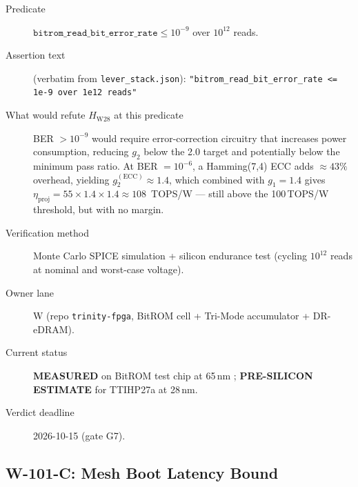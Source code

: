 \begin{description}
  \item[Predicate] \(\mathtt{bitrom\_read\_bit\_error\_rate}
    \leq 10^{-9}\) over \(10^{12}\) reads.
  \item[Assertion text] (verbatim from \texttt{lever\_stack.json}):
    \texttt{"bitrom\_read\_bit\_error\_rate <= 1e-9 over 1e12 reads"}
  \item[What would refute \(H_{\mathrm{W28}}\) at this predicate]
    BER \(> 10^{-9}\) would require error-correction circuitry that increases
    power consumption, reducing \(g_{2}\) below the 2.0 target and potentially
    below the minimum pass ratio.  At BER \(= 10^{-6}\), a Hamming(7,4) ECC
    adds \(\approx 43\%\) overhead, yielding \(g_{2}^{(\mathrm{ECC})} \approx 1.4\),
    which combined with \(g_{1} = 1.4\) gives
    \(\eta_{\mathrm{proj}} = 55 \times 1.4 \times 1.4 \approx 108\)~TOPS/W ---
    still above the 100\,TOPS/W threshold, but with no margin.
  \item[Verification method] Monte Carlo SPICE simulation + silicon endurance
    test (cycling \(10^{12}\) reads at nominal and worst-case voltage).
  \item[Owner lane] W (repo \texttt{trinity-fpga}, BitROM cell + Tri-Mode
    accumulator + DR-eDRAM).
  \item[Current status] \textbf{MEASURED} on BitROM test chip at 65\,nm
    \cite{bitrom_2025}; \textbf{PRE-SILICON ESTIMATE} for TTIHP27a at 28\,nm.
  \item[Verdict deadline] 2026-10-15 (gate G7).
\end{description}

\subsection{W-101-C: Mesh Boot Latency Bound}
\label{sec:w101c}

